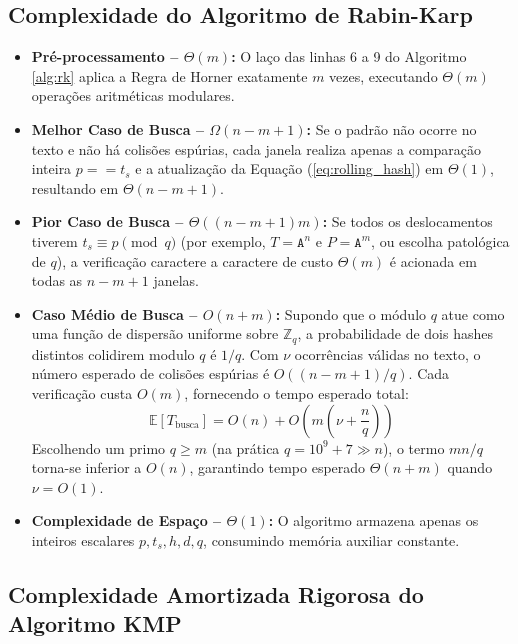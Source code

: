 \documentclass[12pt,a4paper]{article}
\begin{document}
\subsection{Complexidade do Algoritmo de Rabin-Karp}
\begin{itemize}
    \item \textbf{Pr\'e-processamento -- $\Theta(m)$:} O la\c{c}o das linhas 6 a 9 do Algoritmo \ref{alg:rk} aplica a Regra de Horner exatamente $m$ vezes, executando $\Theta(m)$ opera\c{c}\~oes aritm\'eticas modulares.
    \item \textbf{Melhor Caso de Busca -- $\Omega(n - m + 1)$:} Se o padr\~ao n\~ao ocorre no texto e n\~ao h\'a colis\~oes esp\'urias, cada janela realiza apenas a compara\c{c}\~ao inteira $p == t_s$ e a atualiza\c{c}\~ao da Equa\c{c}\~ao (\ref{eq:rolling_hash}) em $\Theta(1)$, resultando em $\Theta(n - m + 1)$.
    \item \textbf{Pior Caso de Busca -- $\Theta((n - m + 1)m)$:} Se todos os deslocamentos tiverem $t_s \equiv p \pmod q$ (por exemplo, $T = \texttt{A}^n$ e $P = \texttt{A}^m$, ou escolha patol\'ogica de $q$), a verifica\c{c}\~ao caractere a caractere de custo $\Theta(m)$ \'e acionada em todas as $n - m + 1$ janelas.
    \item \textbf{Caso M\'edio de Busca -- $O(n + m)$:} Supondo que o m\'odulo $q$ atue como uma fun\c{c}\~ao de dispers\~ao uniforme sobre $\mathbb{Z}_q$, a probabilidade de dois hashes distintos colidirem modulo $q$ \'e $1/q$. Com $\nu$ ocorr\^encias v\'alidas no texto, o n\'umero esperado de colis\~oes esp\'urias \'e $O((n - m + 1)/q)$. Cada verifica\c{c}\~ao custa $O(m)$, fornecendo o tempo esperado total:
    \begin{equation}
        \mathbb{E}[T_{\text{busca}}] = O(n) + O\left(m \left(\nu + \frac{n}{q}\right)\right)
    \end{equation}
    Escolhendo um primo $q \ge m$ (na pr\'atica $q = 10^9 + 7 \gg n$), o termo $mn/q$ torna-se inferior a $O(n)$, garantindo tempo esperado $\Theta(n + m)$ quando $\nu = O(1)$.
    \item \textbf{Complexidade de Espa\c{c}o -- $\Theta(1)$:} O algoritmo armazena apenas os inteiros escalares $p, t_s, h, d, q$, consumindo mem\'oria auxiliar constante.
\end{itemize}

\subsection{Complexidade Amortizada Rigorosa do Algoritmo KMP}
\end{document}
